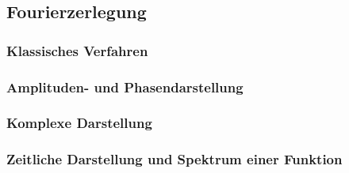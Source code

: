 \subsection{Fourierzerlegung}

\subsubsection{Klassisches Verfahren}

\subsubsection{Amplituden- und Phasendarstellung}

\subsubsection{Komplexe Darstellung}

\subsubsection{Zeitliche Darstellung und Spektrum einer Funktion}
